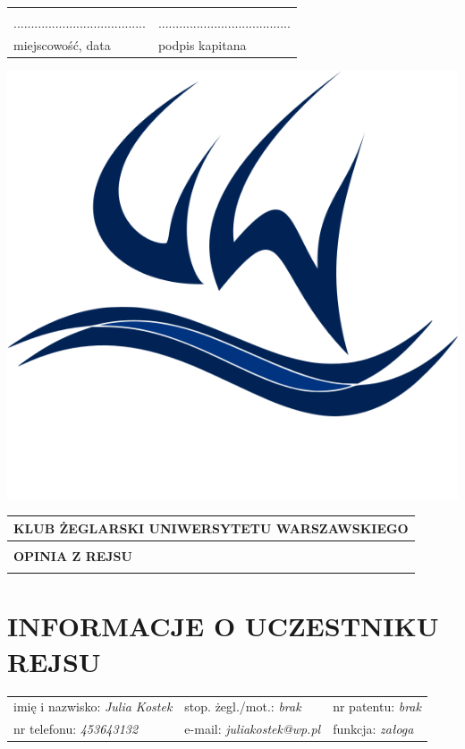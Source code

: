 \documentclass{article}
\begin{document}
\begin{tabularx}{\textwidth}{X X}
\\\\
...................................... & ......................................\\
miejscowość, data & podpis kapitana\\
\end{tabularx}
\newpage
\begin{minipage}{0.11\textwidth}
\includegraphics[width=\textwidth]{logo.png}
\end{minipage}
\begin{minipage}{0.89\textwidth}
\begin{tabularx}{\textwidth} { 
  | >{\centering\arraybackslash}X | }
 \hline
 \textbf{KLUB ŻEGLARSKI UNIWERSYTETU WARSZAWSKIEGO} \\
 \hline
 \\
 \textbf{\huge OPINIA Z REJSU} \\
 \\
\hline
\end{tabularx}
\end{minipage}

\section*{INFORMACJE O UCZESTNIKU REJSU}
\begin{tabularx}{\textwidth}{X X X}
imię i nazwisko: \textit{Julia Kostek} & stop. żegl./mot.: \textit{brak} & nr patentu: \textit{brak} \\
nr telefonu: \textit{453643132} & e-mail: \textit{juliakostek@wp.pl} & funkcja: \textit{załoga} \\
\end{tabularx}
\end{document}
